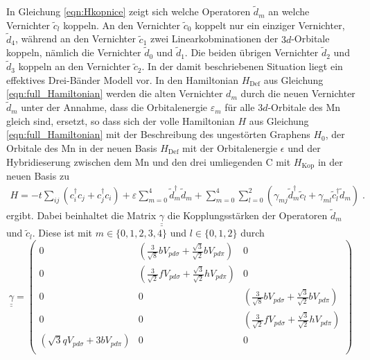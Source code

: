 In Gleichung \eqref{eqn:Hkopnice} zeigt sich welche Operatoren $\tilde{d}_m$ an welche Vernichter $\tilde{c}_l$ koppeln.
An den Vernichter $\tilde{c}_{0}$ koppelt nur ein einziger Vernichter, $\tilde{d}_{4}$, während an den Vernichter $\tilde{c}_{1}$ zwei Linearkobminationen der $3d$-Orbitale koppeln, nämlich 
die Vernichter $\tilde{d}_{0}$ und $\tilde{d}_{1}$. 
Die beiden übrigen Vernichter $\tilde{d}_{2}$ und $\tilde{d}_{3}$ koppeln an den Vernichter  $\tilde{c}_{2}$.
In der damit beschriebenen Situation liegt ein effektives Drei-Bänder Modell vor.
In den Hamiltonian $H_\text{Def}$ aus Gleichung \eqref{eqn:full_Hamiltonian} werden die alten Vernichter $d_m$ durch die neuen Vernichter $\tilde{d}_m$ unter 
der Annahme, dass die Orbitalenergie $\varepsilon_m$ für alle $3d$-Orbitale des Mn gleich sind, ersetzt, so dass sich der volle Hamiltonian $H$
aus Gleichung \eqref{eqn:full_Hamiltonian} mit der Beschreibung des ungestörten Graphens $H_0$, 
der Orbitale des Mn in der neuen Basis $H_{\text{Def}}$ mit der Orbitalenergie $\epsilon$ und
der Hybridieserung zwischen dem Mn und den drei umliegenden C mit $H_\text{Kop}$ in der neuen Basis zu
\begin{align}
    H = -t\sum_{ij}(c^\dagger_i c_j + c^\dagger_j c_i) + \varepsilon \sum_{m=0}^4 \tilde{d}^\dagger_m \tilde{d}_m +
    \sum_{m=0}^4\sum_{l=0}^2(\gamma_{mj} \tilde{d}^\dagger_m \tilde{c}_l + \gamma_{ml} \tilde{c}^\dagger_l \tilde{d}_m) \; .
\end{align}
ergibt.
Dabei beinhaltet die Matrix $\underline{\underline{\gamma}}$ die Kopplungsstärken der Operatoren $\tilde{d}_m$ und $\tilde{c}_l$.
Diese ist mit $m \in \{ 0,1,2,3,4 \}$ und $l \in \{ 0,1,2 \}$ durch
\begin{equation*}
     \underline{\underline{\gamma}} = 
    \begin{pmatrix}
        0               & \left ( \frac{3}{\sqrt{8}} b V_{pd\sigma} + \frac{\sqrt{3}}{\sqrt{2}}  b   V_{pd\pi} \right )    &   0           \\
        0               & \left ( \frac{3}{\sqrt{2}} f V_{pd\sigma} + \frac{\sqrt{3}}{\sqrt{2}}  h   V_{pd\pi} \right )   &   0           \\
        0               & 0             &   \left ( \frac{3}{\sqrt{8}} b V_{pd\sigma} + \frac{\sqrt{3}}{\sqrt{2}}  b   V_{pd\pi} \right ) \\
        0               & 0             &   \left ( \frac{3}{\sqrt{2}} f V_{pd\sigma} + \frac{\sqrt{3}}{\sqrt{2}}  h   V_{pd\pi} \right ) \\
        \left (  \sqrt{3} q V_{pd\sigma} + 3 b V_{pd\pi} \right )     & 0             &   0           \\
    \end{pmatrix}
\end{equation*} \label{eqn:gammakop}
